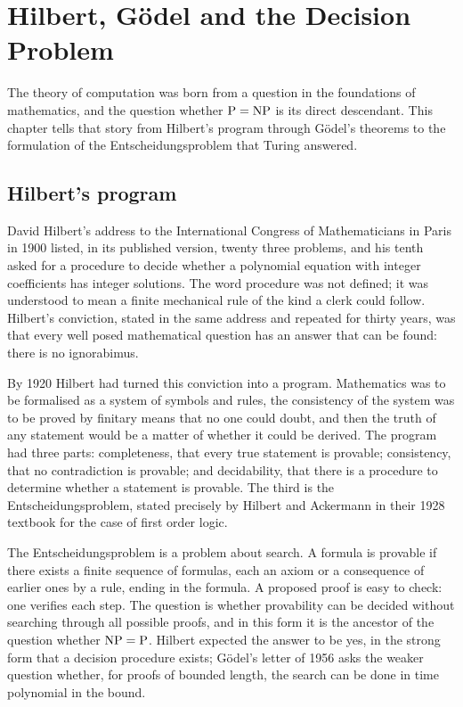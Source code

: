 \chapter{Hilbert, G\"odel and the Decision Problem}
\label{ch:hilbert}

The theory of computation was born from a question in the foundations of mathematics, and the question whether $\mathrm{P} = \mathrm{NP}$ is its direct descendant. This chapter tells that story from Hilbert's program through G\"odel's theorems to the formulation of the Entscheidungsproblem that Turing answered.

\section{Hilbert's program}

David Hilbert's address to the International Congress of Mathematicians in Paris in 1900 listed, in its published version, twenty three problems, and his tenth asked for a procedure to decide whether a polynomial equation with integer coefficients has integer solutions. The word procedure was not defined; it was understood to mean a finite mechanical rule of the kind a clerk could follow. Hilbert's conviction, stated in the same address and repeated for thirty years, was that every well posed mathematical question has an answer that can be found: there is no ignorabimus.

By 1920 Hilbert had turned this conviction into a program. Mathematics was to be formalised as a system of symbols and rules, the consistency of the system was to be proved by finitary means that no one could doubt, and then the truth of any statement would be a matter of whether it could be derived. The program had three parts: completeness, that every true statement is provable; consistency, that no contradiction is provable; and decidability, that there is a procedure to determine whether a statement is provable. The third is the Entscheidungsproblem, stated precisely by Hilbert and Ackermann in their 1928 textbook for the case of first order logic.

The Entscheidungsproblem is a problem about search. A formula is provable if there exists a finite sequence of formulas, each an axiom or a consequence of earlier ones by a rule, ending in the formula. A proposed proof is easy to check: one verifies each step. The question is whether provability can be decided without searching through all possible proofs, and in this form it is the ancestor of the question whether $\mathrm{NP} = \mathrm{P}$. Hilbert expected the answer to be yes, in the strong form that a decision procedure exists; G\"odel's letter of 1956 asks the weaker question whether, for proofs of bounded length, the search can be done in time polynomial in the bound.

